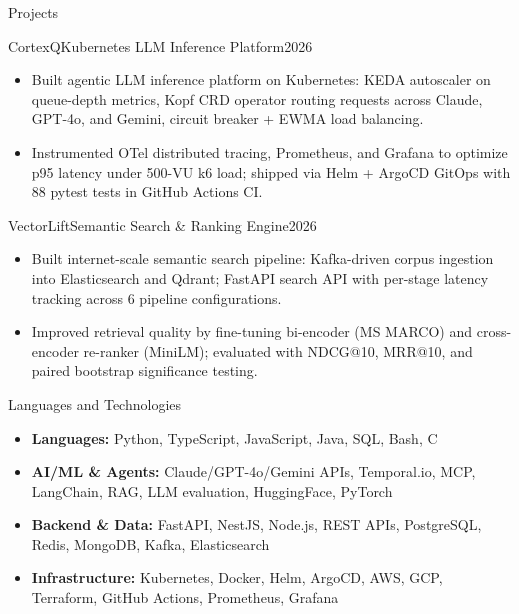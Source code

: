 \documentclass[]{mcdowellcv}
\begin{document}
\begin{cvsection}{Projects}
  \begin{cvsubsection}{CortexQ}{Kubernetes LLM Inference Platform}{2026}
    \begin{itemize}
      \item Built agentic LLM inference platform on Kubernetes: KEDA autoscaler on queue-depth metrics, Kopf CRD operator routing requests across Claude, GPT-4o, and Gemini, circuit breaker + EWMA load balancing.
      \item Instrumented OTel distributed tracing, Prometheus, and Grafana to optimize p95 latency under 500-VU k6 load; shipped via Helm + ArgoCD GitOps with 88 pytest tests in GitHub Actions CI.
    \end{itemize}
    \vspace{-1.5pt}
  \end{cvsubsection}

  \begin{cvsubsection}{VectorLift}{Semantic Search \& Ranking Engine}{2026}
    \begin{itemize}
      \item Built internet-scale semantic search pipeline: Kafka-driven corpus ingestion into Elasticsearch and Qdrant; FastAPI search API with per-stage latency tracking across 6 pipeline configurations.
      \item Improved retrieval quality by fine-tuning bi-encoder (MS MARCO) and cross-encoder re-ranker (MiniLM); evaluated with NDCG@10, MRR@10, and paired bootstrap significance testing.
    \end{itemize}
    \vspace{-1.5pt}
  \end{cvsubsection}

\end{cvsection}

\begin{cvsection}{Languages and Technologies}
  \begin{cvsubsection}{}{}{}
    \begin{itemize}
      \item \textbf{Languages:} Python, TypeScript, JavaScript, Java, SQL, Bash, C
      \item \textbf{AI/ML \& Agents:} Claude/GPT-4o/Gemini APIs, Temporal.io, MCP, LangChain, RAG, LLM evaluation, HuggingFace, PyTorch
      \item \textbf{Backend \& Data:} FastAPI, NestJS, Node.js, REST APIs, PostgreSQL, Redis, MongoDB, Kafka, Elasticsearch
      \item \textbf{Infrastructure:} Kubernetes, Docker, Helm, ArgoCD, AWS, GCP, Terraform, GitHub Actions, Prometheus, Grafana
    \end{itemize}
  \end{cvsubsection}
\end{cvsection}
\end{document}
